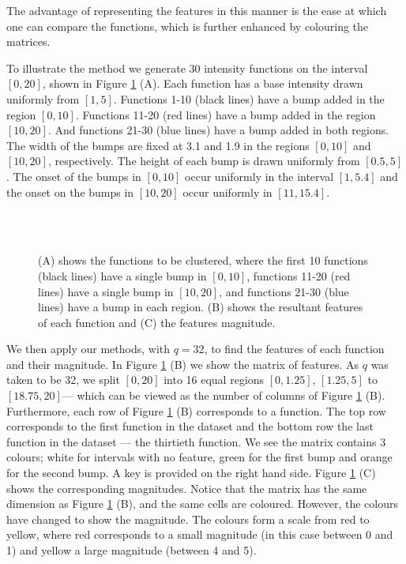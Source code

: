\documentclass[../main.tex]{subfiles}
\begin{document}
The advantage of representing the features in this manner is the ease at which one can compare the functions, which is further enhanced by colouring the matrices. 

To illustrate the method we generate 30 intensity functions on the interval $[0,20]$, shown in Figure \ref{fig:Example} (A). Each function has a base intensity drawn uniformly from $[1,5]$. Functions 1-10 (black lines) have a bump added in the region $[0,10]$. Functions 11-20 (red lines) have a bump added in the region $[10,20]$. And functions 21-30 (blue lines) have a bump added in both regions. The width of the bumps are fixed at 3.1 and 1.9 in the regions $[0,10]$ and $[10,20]$, respectively. The height of each bump is drawn uniformly from $[0.5,5]$. The onset of the bumps in $[0,10]$ occur uniformly in the interval $[1,5.4]$ and the onset on the bumps in $[10,20]$ occur uniformly in $[11,15.4]$. 

 \begin{figure}[t!]
   \hrulefill
   \begin{center} 
     \\
       \\
    \end{center}     
    \caption{(A) shows the functions to be clustered, where the first 10 functions (black lines) have a single bump in $[0,10]$, functions 11-20 (red lines) have a single bump in $[10,20]$, and functions 21-30 (blue lines) have a bump in each region. (B) shows the resultant features of each function and (C) the features magnitude.}
    \label{fig:Example}
    \hrulefill
    \end{figure}
    
We then apply our methods, with $q=32$, to find the features of each function and their magnitude. In Figure \ref{fig:Example} (B) we show the matrix of features. As $q$ was taken to be 32, we split $[0,20]$ into 16 equal regions $[0,1.25]$, $[1.25,5]$ to $[18.75,20]$--- which can be viewed as the number of columns of Figure \ref{fig:Example} (B). Furthermore, each row of Figure \ref{fig:Example} (B) corresponds to a function. The top row corresponds to the first function in the dataset and the bottom row the last function in the dataset --- the thirtieth function. We see the matrix contains 3 colours; white for intervals with no feature, green for the first bump and orange for the second bump. A key is provided on the right hand side. Figure \ref{fig:Example} (C) shows the corresponding magnitudes. Notice that the matrix has the same dimension as Figure \ref{fig:Example} (B), and the same cells are coloured. However, the colours have changed to show the magnitude. The colours form a scale from red to yellow, where red corresponds to a small magnitude (in this case between 0 and 1) and yellow a large magnitude (between 4 and 5). 
	
\end{document}
